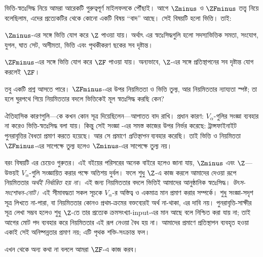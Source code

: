 \documentclass[../../../include/open-logic-section]{subfiles}
\begin{document}

ভিত্তি-স্বতঃসিদ্ধ নিয়ে আমরা আরেকটি গুরুত্বপূর্ণ
মাইলফলকে পৌঁছাই। আগে $\Zminus$ ও
$\ZFminus$ তত্ত্ব নিয়ে বলেছিলাম, এদের
প্রত্যেকটির থেকে কোনো একটি বিষয় ``বাদ'' আছে।
সেই বিষয়টি হলো ভিত্তি। তাই:

\begin{defn}
$\Zminus$-এর সঙ্গে ভিত্তি যোগ করে $\Z$
পাওয়া যায়। অর্থাৎ এর স্বতঃসিদ্ধগুলি হলো
সদস্যভিত্তিক সমতা, সংযোগ, যুগল, ঘাত সেট, অসীমতা,
ভিত্তি এবং পৃথকীকরণ ছকের সব দৃষ্টান্ত।

$\ZFminus$-এর সঙ্গে ভিত্তি যোগ করে $\ZF$
পাওয়া যায়। অন্যভাবে, $\Z$-এর সঙ্গে
প্রতিস্থাপনের সব দৃষ্টান্ত যোগ করলেই $\ZF$।
\end{defn}

তবু একটি প্রশ্ন আসতে পারে। $\ZFminus$-এর
উপর নিয়মিততা ও ভিত্তি তুল্য, আর
নিয়মিততার ন্যায্যতা স্পষ্ট; তা হলে ঘুরপথে
গিয়ে নিয়মিততার বদলে ভিত্তিকেই মূল
স্বতঃসিদ্ধ করছি কেন?

ঐতিহাসিক কারণগুলি—কে কখন কোন সূত্র
দিয়েছিলেন—আপাতত বাদ রাখি। প্রধান কারণ:
$V_\alpha$-গুলির সংজ্ঞা ব্যবহার না করেও
ভিত্তি-স্বতঃসিদ্ধ বলা যায়। কিন্তু সেই সংজ্ঞা
-এর সমস্ত কাজের উপর
নির্ভর করেছে: ট্রান্সফাইনাইট পুনরাবৃত্তির
বৈধতা প্রমাণ করতে হয়েছে। আর সে প্রমাণে
\emph{প্রতিস্থাপন} ব্যবহার করেছি। তাই ভিত্তি
ও নিয়মিততা $\ZFminus$-এর সাপেক্ষে তুল্য
হলেও $\Zminus$-এর সাপেক্ষে তুল্য নয়।

বরং বিষয়টি এর চেয়েও গুরুতর। এই বইয়ের
পরিসরের অনেক বাইরে হলেও জানা যায়,
$\Zminus$ এবং $\Z$—উভয়ই $V_\alpha$-গুলি
সংজ্ঞায়িত করার পক্ষে অতিশয় দুর্বল। ফলে
শুধু $\Z$-এ কাজ করলে আমাদের দেওয়া রূপে
নিয়মিততার \emph{অর্থই নির্ধারিত হয় না}।
এই জন্য নিয়মিততার বদলে ভিত্তিই আমাদের
আনুষ্ঠানিক স্বতঃসিদ্ধ।
\emph{উৎস-সংশোধন-নোট।} এই সীমাবদ্ধতা সকল সূচকে
$V_\alpha$-র অস্তিত্ব ও একমাত্র মান প্রমাণ করার সম্পর্কে।
শুধু সংজ্ঞা-সদৃশ সূত্র লিখতে না-পারা, বা নিয়মিততার কোনও
প্রথম-ক্রমের বক্তব্যেরই অর্থ না-থাকা, এর দাবি নয়।
পুনরাবৃত্তি-সাক্ষীর সূত্র লেখা সম্ভব হলেও শুধু $\Z$-তে
তার প্রত্যেক ক্রমসংখ্যা-input-এর মান আছে বলে নিশ্চিত করা যায় না;
তাই আগের মোট পদ ব্যবহার করে নিয়মিততার এই রূপ নেওয়া বৈধ হয় না।
আমাদের প্রমাণে প্রতিস্থাপন ব্যবহৃত হওয়া একাই সেই অনিষ্পন্নতার
প্রমাণ নয়; এটি পৃথক শক্তি-সংক্রান্ত ফল।

এখন থেকে অন্য কথা না বললে আমরা $\ZF$-এ
কাজ করব।
\end{document}
